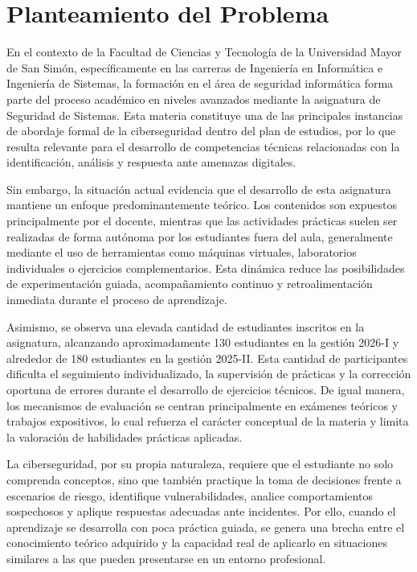 \newpage
\section{Planteamiento del Problema}

En el contexto de la Facultad de Ciencias y Tecnología de la Universidad Mayor de San Simón, específicamente en las carreras de Ingeniería en Informática e Ingeniería de Sistemas, la formación en el área de seguridad informática forma parte del proceso académico en niveles avanzados mediante la asignatura de Seguridad de Sistemas. Esta materia constituye una de las principales instancias de abordaje formal de la ciberseguridad dentro del plan de estudios, por lo que resulta relevante para el desarrollo de competencias técnicas relacionadas con la identificación, análisis y respuesta ante amenazas digitales.

Sin embargo, la situación actual evidencia que el desarrollo de esta asignatura mantiene un enfoque predominantemente teórico. Los contenidos son expuestos principalmente por el docente, mientras que las actividades prácticas suelen ser realizadas de forma autónoma por los estudiantes fuera del aula, generalmente mediante el uso de herramientas como máquinas virtuales, laboratorios individuales o ejercicios complementarios. Esta dinámica reduce las posibilidades de experimentación guiada, acompañamiento continuo y retroalimentación inmediata durante el proceso de aprendizaje.

Asimismo, se observa una elevada cantidad de estudiantes inscritos en la asignatura, alcanzando aproximadamente 130 estudiantes en la gestión 2026-I y alrededor de 180 estudiantes en la gestión 2025-II. Esta cantidad de participantes dificulta el seguimiento individualizado, la supervisión de prácticas y la corrección oportuna de errores durante el desarrollo de ejercicios técnicos. De igual manera, los mecanismos de evaluación se centran principalmente en exámenes teóricos y trabajos expositivos, lo cual refuerza el carácter conceptual de la materia y limita la valoración de habilidades prácticas aplicadas.

La ciberseguridad, por su propia naturaleza, requiere que el estudiante no solo comprenda conceptos, sino que también practique la toma de decisiones frente a escenarios de riesgo, identifique vulnerabilidades, analice comportamientos sospechosos y aplique respuestas adecuadas ante incidentes. Por ello, cuando el aprendizaje se desarrolla con poca práctica guiada, se genera una brecha entre el conocimiento teórico adquirido y la capacidad real de aplicarlo en situaciones similares a las que pueden presentarse en un entorno profesional.

